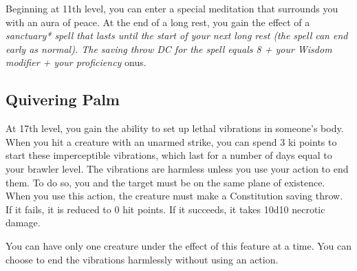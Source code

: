 Beginning at 11th level, you can enter a special meditation that surrounds you with an aura of peace. At the end of a long rest, you gain the effect of a \textit{sanctuary* spell that lasts until the start of your next long rest (the spell can end early as normal). The saving throw DC for the spell equals 8 + your Wisdom modifier + your proficiency }onus.

\subsection{Quivering Palm}

At 17th level, you gain the ability to set up lethal vibrations in someone’s body. When you hit a creature with an unarmed strike, you can spend 3 ki points to start these imperceptible vibrations, which last for a number of days equal to your brawler level. The vibrations are harmless unless you use your action to end them. To do so, you and the target must be on the same plane of existence. When you use this action, the creature must make a Constitution saving throw. If it fails, it is reduced to 0 hit points. If it succeeds, it takes 10d10 necrotic damage.

You can have only one creature under the effect of this feature at a time. You can choose to end the vibrations harmlessly without using an action.